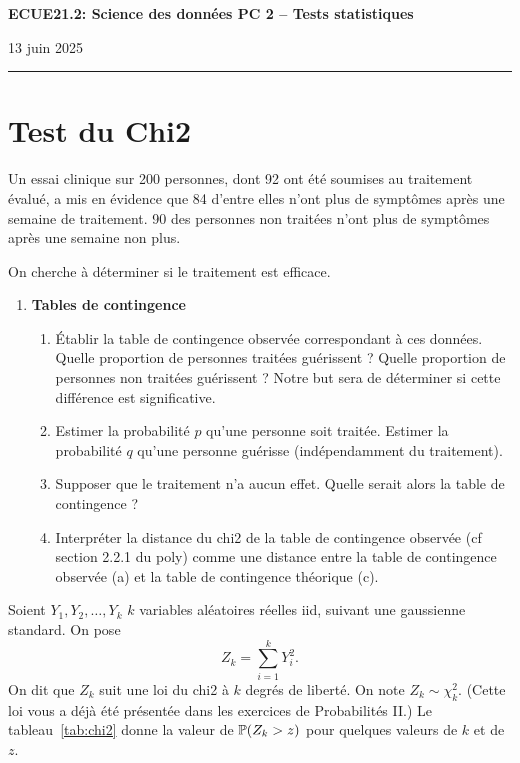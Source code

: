 \documentclass[french,11pt]{article}
\begin{document}
\begin{center}
\bf\large ECUE21.2: Science des données \hfill
PC 2 -- Tests statistiques
\end{center}

\noindent
\hfill 13 juin 2025

\noindent
\rule{\textwidth}{.4pt}


\section{Test du Chi2}
Un essai clinique sur 200 personnes, dont 92 ont été soumises au traitement
évalué, a mis en évidence que 84 d'entre elles n'ont plus de symptômes après
une semaine de traitement. 90 des personnes non traitées n'ont plus de
symptômes après une semaine non plus.

On cherche à déterminer si le traitement est efficace.

\begin{enumerate}
\item \textbf{Tables de contingence}
  \begin{enumerate}
  \item Établir la table de contingence observée correspondant à ces
    données. Quelle proportion de personnes traitées guérissent ? Quelle
    proportion de personnes non traitées guérissent ? Notre but sera de
    déterminer si cette différence est significative.
  \item Estimer la probabilité $p$ qu'une personne soit traitée. Estimer la
    probabilité $q$ qu'une personne guérisse (indépendamment du traitement).
  \item Supposer que le traitement n'a aucun effet. Quelle serait alors la
    table de contingence ?
  \item Interpréter la distance du chi2 de la table de contingence observée (cf
    section 2.2.1 du poly) comme une distance entre la table de contingence
    observée (a) et la table de contingence théorique (c).
  \end{enumerate}
\end{enumerate}

Soient $Y_1, Y_2, \dots, Y_k$ $k$ variables aléatoires réelles iid, suivant une
gaussienne standard. On pose
\[
  Z_k = \sum_{i=1}^k Y_i^2.
\]
On dit que $Z_k$ suit une loi du chi2 à $k$ degrés de liberté. On note
$Z_k \sim \chi_k^2$. (Cette loi vous a déjà été présentée dans les exercices de Probabilités II.)
Le tableau~\ref{tab:chi2} donne la valeur de $\mathbb{P}(Z_k > z)$ pour quelques
valeurs de $k$ et de $z$.
\end{document}

